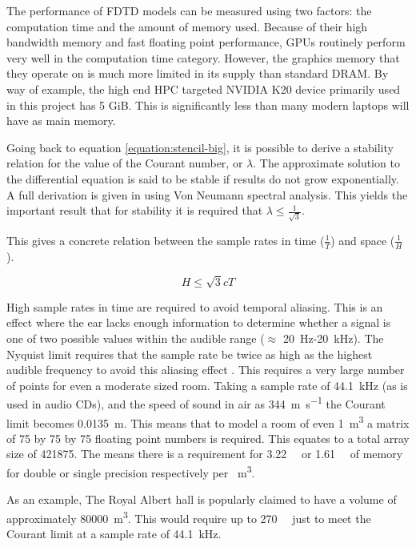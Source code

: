 \documentclass[12pt,a4paper]{report}
\begin{document}
The performance of FDTD models can be measured using two factors: the computation time and the amount of memory used. Because of their high bandwidth memory and fast floating point performance, GPUs routinely perform very well in the computation time category. However, the graphics memory that they operate on is much more limited in its supply than standard DRAM. By way of example, the high end HPC targeted NVIDIA K20 device primarily used in this project has 5 GiB. This is significantly less than many modern laptops will have as main memory.

Going back to equation \ref{equation:stencil-big}, it is possible to derive a stability relation for the value of the Courant number, or $\lambda$. The approximate solution to the differential equation is said to be stable if results do not grow exponentially. A full derivation is given in \cite{ref:strik} using Von Neumann spectral analysis. This yields the important result that for stability it is required that $\lambda \leq \frac{1}{\sqrt{3}}$.

This gives a concrete relation between the sample rates in time ($\frac{1}{T}$) and space ($\frac{1}{H}$).

\begin{equation}
\label{equation:stability}
H \leq \sqrt{3}cT
\end{equation}

High sample rates in time are required to avoid temporal aliasing. This is an effect where the ear lacks enough information to determine whether a signal is one of two possible values within the audible range ($\approx$ \SI{20}{\hertz}-\SI{20}{\kilo\hertz}). The Nyquist limit requires that the sample rate be twice as high as the highest audible frequency to avoid this aliasing effect \cite{ref:harris}. This requires a very large number of points for even a moderate sized room. Taking a sample rate of \SI{44.1}{\kilo\hertz} (as is used in audio CDs), and the speed of sound in air as \SI{344}{\metre\per\second} the Courant limit becomes \SI{0.0135}{\metre}. This means that to model a room of even \SI{1}{\metre\cubed} a matrix of \num{75} by \num{75} by \num{75} floating point numbers is required. This equates to a total array size of \num{421875}. The means there is a requirement for \SI{3.22}{\mebi\byte} or \SI{1.61}{\mebi\byte} of memory for double or single precision respectively per \SI{}{\metre\cubed}.

As an example, The Royal Albert hall is popularly claimed to have a volume of approximately \SI{80000}{\metre\cubed}. This would require up to \SI{270}{\gibi\byte} just to meet the Courant limit at a sample rate of \SI{44.1}{\kilo\hertz}.
\end{document}
